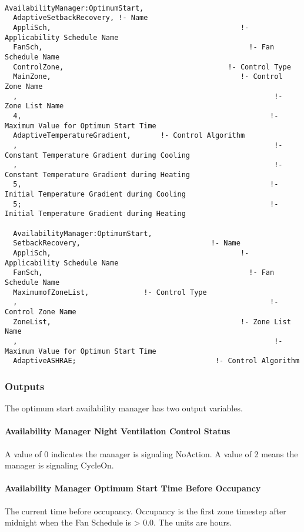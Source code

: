 \begin{lstlisting}

AvailabilityManager:OptimumStart,
  AdaptiveSetbackRecovery, !- Name
  AppliSch,                                             !- Applicability Schedule Name
  FanSch,                                                 !- Fan Schedule Name
  ControlZone,                                       !- Control Type
  MainZone,                                             !- Control Zone Name
  ,                                                             !- Zone List Name
  4,                                                           !- Maximum Value for Optimum Start Time
  AdaptiveTemperatureGradient,       !- Control Algorithm
  ,                                                             !- Constant Temperature Gradient during Cooling
  ,                                                             !- Constant Temperature Gradient during Heating
  5,                                                           !- Initial Temperature Gradient during Cooling
  5;                                                           !- Initial Temperature Gradient during Heating

  AvailabilityManager:OptimumStart,
  SetbackRecovery,                               !- Name
  AppliSch,                                             !- Applicability Schedule Name
  FanSch,                                                 !- Fan Schedule Name
  MaximumofZoneList,             !- Control Type
  ,                                                            !- Control Zone Name
  ZoneList,                                             !- Zone List Name
  ,                                                             !- Maximum Value for Optimum Start Time
  AdaptiveASHRAE;                                 !- Control Algorithm
\end{lstlisting}

\subsubsection{Outputs}\label{outputs-10-007}

The optimum start availability manager has two output variables.

\paragraph{Availability Manager Night Ventilation Control Status}\label{availability-manager-night-ventilation-control-status-1}

A value of 0 indicates the manager is signaling NoAction. A value of 2 means the manager is signaling CycleOn.

\paragraph{Availability Manager Optimum Start Time Before Occupancy}\label{availability-manager-optimum-start-time-before-occupancy}

The current time before occupancy. Occupancy is the first zone timestep after midnight when the Fan Schedule is \textgreater{} 0.0. The units are hours.
